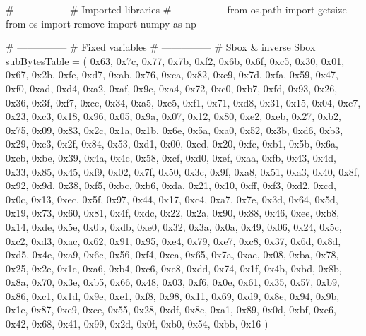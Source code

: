 \begin{python}
# ---------------
# Imported libraries
# ---------------
from os.path import getsize
from os import remove
import numpy as np

# ---------------
# Fixed variables
# ---------------
# Sbox & inverse Sbox
subBytesTable = (
    0x63, 0x7c, 0x77, 0x7b, 0xf2, 0x6b, 0x6f, 0xc5, 0x30, 0x01, 0x67, 0x2b, 0xfe, 0xd7, 0xab, 0x76,
    0xca, 0x82, 0xc9, 0x7d, 0xfa, 0x59, 0x47, 0xf0, 0xad, 0xd4, 0xa2, 0xaf, 0x9c, 0xa4, 0x72, 0xc0,
    0xb7, 0xfd, 0x93, 0x26, 0x36, 0x3f, 0xf7, 0xcc, 0x34, 0xa5, 0xe5, 0xf1, 0x71, 0xd8, 0x31, 0x15,
    0x04, 0xc7, 0x23, 0xc3, 0x18, 0x96, 0x05, 0x9a, 0x07, 0x12, 0x80, 0xe2, 0xeb, 0x27, 0xb2, 0x75,
    0x09, 0x83, 0x2c, 0x1a, 0x1b, 0x6e, 0x5a, 0xa0, 0x52, 0x3b, 0xd6, 0xb3, 0x29, 0xe3, 0x2f, 0x84,
    0x53, 0xd1, 0x00, 0xed, 0x20, 0xfc, 0xb1, 0x5b, 0x6a, 0xcb, 0xbe, 0x39, 0x4a, 0x4c, 0x58, 0xcf,
    0xd0, 0xef, 0xaa, 0xfb, 0x43, 0x4d, 0x33, 0x85, 0x45, 0xf9, 0x02, 0x7f, 0x50, 0x3c, 0x9f, 0xa8,
    0x51, 0xa3, 0x40, 0x8f, 0x92, 0x9d, 0x38, 0xf5, 0xbc, 0xb6, 0xda, 0x21, 0x10, 0xff, 0xf3, 0xd2,
    0xcd, 0x0c, 0x13, 0xec, 0x5f, 0x97, 0x44, 0x17, 0xc4, 0xa7, 0x7e, 0x3d, 0x64, 0x5d, 0x19, 0x73,
    0x60, 0x81, 0x4f, 0xdc, 0x22, 0x2a, 0x90, 0x88, 0x46, 0xee, 0xb8, 0x14, 0xde, 0x5e, 0x0b, 0xdb,
    0xe0, 0x32, 0x3a, 0x0a, 0x49, 0x06, 0x24, 0x5c, 0xc2, 0xd3, 0xac, 0x62, 0x91, 0x95, 0xe4, 0x79,
    0xe7, 0xc8, 0x37, 0x6d, 0x8d, 0xd5, 0x4e, 0xa9, 0x6c, 0x56, 0xf4, 0xea, 0x65, 0x7a, 0xae, 0x08,
    0xba, 0x78, 0x25, 0x2e, 0x1c, 0xa6, 0xb4, 0xc6, 0xe8, 0xdd, 0x74, 0x1f, 0x4b, 0xbd, 0x8b, 0x8a,
    0x70, 0x3e, 0xb5, 0x66, 0x48, 0x03, 0xf6, 0x0e, 0x61, 0x35, 0x57, 0xb9, 0x86, 0xc1, 0x1d, 0x9e,
    0xe1, 0xf8, 0x98, 0x11, 0x69, 0xd9, 0x8e, 0x94, 0x9b, 0x1e, 0x87, 0xe9, 0xce, 0x55, 0x28, 0xdf,
    0x8c, 0xa1, 0x89, 0x0d, 0xbf, 0xe6, 0x42, 0x68, 0x41, 0x99, 0x2d, 0x0f, 0xb0, 0x54, 0xbb, 0x16
    )


\end{python}

